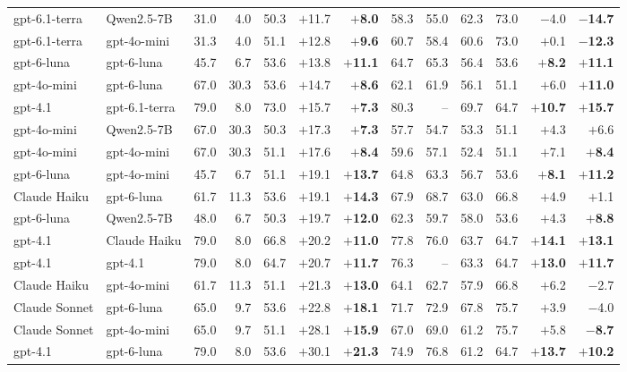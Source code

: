 \begin{table}[t]
\begin{tabular}{llrrrrrrrrrrr}
gpt-6.1-terra & Qwen2.5-7B & 31.0 & 4.0 & 50.3 & $+$11.7 & \textbf{$+$8.0} & 58.3 & 55.0 & 62.3 & 73.0 & $-$4.0 & \textbf{$-$14.7} \\
gpt-6.1-terra & gpt-4o-mini & 31.3 & 4.0 & 51.1 & $+$12.8 & \textbf{$+$9.6} & 60.7 & 58.4 & 60.6 & 73.0 & $+$0.1 & \textbf{$-$12.3} \\
gpt-6-luna & gpt-6-luna & 45.7 & 6.7 & 53.6 & $+$13.8 & \textbf{$+$11.1} & 64.7 & 65.3 & 56.4 & 53.6 & \textbf{$+$8.2} & \textbf{$+$11.1} \\
gpt-4o-mini & gpt-6-luna & 67.0 & 30.3 & 53.6 & $+$14.7 & \textbf{$+$8.6} & 62.1 & 61.9 & 56.1 & 51.1 & $+$6.0 & \textbf{$+$11.0} \\
gpt-4.1 & gpt-6.1-terra & 79.0 & 8.0 & 73.0 & $+$15.7 & \textbf{$+$7.3} & 80.3 & -- & 69.7 & 64.7 & \textbf{$+$10.7} & \textbf{$+$15.7} \\
gpt-4o-mini & Qwen2.5-7B & 67.0 & 30.3 & 50.3 & $+$17.3 & \textbf{$+$7.3} & 57.7 & 54.7 & 53.3 & 51.1 & $+$4.3 & $+$6.6 \\
gpt-4o-mini & gpt-4o-mini & 67.0 & 30.3 & 51.1 & $+$17.6 & \textbf{$+$8.4} & 59.6 & 57.1 & 52.4 & 51.1 & $+$7.1 & \textbf{$+$8.4} \\
gpt-6-luna & gpt-4o-mini & 45.7 & 6.7 & 51.1 & $+$19.1 & \textbf{$+$13.7} & 64.8 & 63.3 & 56.7 & 53.6 & \textbf{$+$8.1} & \textbf{$+$11.2} \\
Claude Haiku & gpt-6-luna & 61.7 & 11.3 & 53.6 & $+$19.1 & \textbf{$+$14.3} & 67.9 & 68.7 & 63.0 & 66.8 & $+$4.9 & $+$1.1 \\
gpt-6-luna & Qwen2.5-7B & 48.0 & 6.7 & 50.3 & $+$19.7 & \textbf{$+$12.0} & 62.3 & 59.7 & 58.0 & 53.6 & $+$4.3 & \textbf{$+$8.8} \\
gpt-4.1 & Claude Haiku & 79.0 & 8.0 & 66.8 & $+$20.2 & \textbf{$+$11.0} & 77.8 & 76.0 & 63.7 & 64.7 & \textbf{$+$14.1} & \textbf{$+$13.1} \\
gpt-4.1 & gpt-4.1 & 79.0 & 8.0 & 64.7 & $+$20.7 & \textbf{$+$11.7} & 76.3 & -- & 63.3 & 64.7 & \textbf{$+$13.0} & \textbf{$+$11.7} \\
Claude Haiku & gpt-4o-mini & 61.7 & 11.3 & 51.1 & $+$21.3 & \textbf{$+$13.0} & 64.1 & 62.7 & 57.9 & 66.8 & $+$6.2 & $-$2.7 \\
Claude Sonnet & gpt-6-luna & 65.0 & 9.7 & 53.6 & $+$22.8 & \textbf{$+$18.1} & 71.7 & 72.9 & 67.8 & 75.7 & $+$3.9 & $-$4.0 \\
Claude Sonnet & gpt-4o-mini & 65.0 & 9.7 & 51.1 & $+$28.1 & \textbf{$+$15.9} & 67.0 & 69.0 & 61.2 & 75.7 & $+$5.8 & \textbf{$-$8.7} \\
gpt-4.1 & gpt-6-luna & 79.0 & 8.0 & 53.6 & $+$30.1 & \textbf{$+$21.3} & 74.9 & 76.8 & 61.2 & 64.7 & \textbf{$+$13.7} & \textbf{$+$10.2} \\

\end{tabular}
\end{table}
